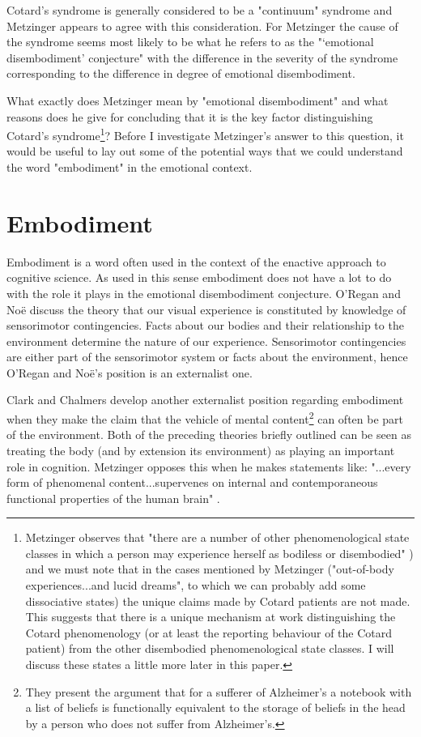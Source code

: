 Cotard's syndrome is generally considered to be a "continuum" syndrome \cite[p. 173]{enoch1991}\cite[p. 148]{young1995} and Metzinger appears to agree with this consideration. For Metzinger the cause of the syndrome seems most likely to be what he refers to as the "‘emotional disembodiment' conjecture" \cite[p. 458]{metzinger2003} with the difference in the severity of the syndrome corresponding to the difference in degree of emotional disembodiment.

What exactly does Metzinger mean by "emotional disembodiment" and what reasons does he give for concluding that it is the key factor distinguishing Cotard's syndrome\footnote{Metzinger observes that "there are a number of other phenomenological state classes in which a person may experience herself as bodiless or disembodied" \cite[p. 457]{metzinger2003}) and we must note that in the cases mentioned by Metzinger ("out-of-body experiences...and lucid dreams", to which we can probably add some dissociative states) the unique claims made by Cotard patients are not made. This suggests that there is a unique mechanism at work distinguishing the Cotard phenomenology (or at least the reporting behaviour of the Cotard patient) from the other disembodied phenomenological state classes. I will discuss these states a little more later in this paper.}? Before I investigate Metzinger's answer to this question, it would be useful to lay out some of the potential ways that we could understand the word "embodiment" in the emotional context.

\section{Embodiment}

Embodiment is a word often used in the context of the enactive approach to cognitive science. As used in this sense embodiment does not have a lot to do with the role it plays in the emotional disembodiment conjecture. O'Regan and No\"{e} \cite{oregan2001, noe2006} discuss the theory that our visual experience is constituted by knowledge of sensorimotor contingencies. Facts about our bodies and their relationship to the environment determine the nature of our experience. Sensorimotor contingencies are either part of the sensorimotor system or facts about the environment, hence O'Regan and No\"{e}'s position is an externalist one.

Clark and Chalmers \cite{clark2002} develop another externalist position regarding embodiment when they make the claim that the vehicle of mental content\footnote{They present the argument that for a sufferer of Alzheimer's a notebook with a list of beliefs is functionally equivalent to the storage of beliefs in the head by a person who does not suffer from Alzheimer's.} can often be part of the environment. Both of the preceding theories briefly outlined can be seen as treating the body (and by extension its environment) as playing an important role in cognition. Metzinger opposes this when he makes statements like: "...every form of phenomenal content...supervenes on internal and contemporaneous functional properties of the human brain" \cite[p. 415]{metzinger2003}.

